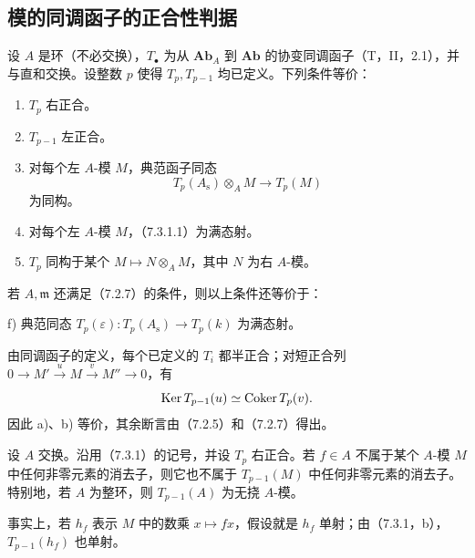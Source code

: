 \subsection{模的同调函子的正合性判据}

设 $A$ 是环（不必交换），$T_\bullet$ 为从 $\mathbf{Ab}_A$ 到 $\mathbf{Ab}$ 的协变同调函子（T，II，2.1），并与直和交换。设整数 $p$ 使得 $T_p,T_{p-1}$ 均已定义。下列条件等价：
\begin{enumerate}[label=\alph*)]
\item $T_p$ 右正合。
\item $T_{p-1}$ 左正合。
\item 对每个左 $A$-模 $M$，典范函子同态
\begin{equation}
 T_p(A_{\mathrm s})\otimes_A M\longrightarrow T_p(M)\tag{7.3.1.1}
\end{equation}
为同构。
\item 对每个左 $A$-模 $M$，（7.3.1.1）为满态射。
\item $T_p$ 同构于某个 $M\mapsto N\otimes_A M$，其中 $N$ 为右 $A$-模。
\end{enumerate}
若 $A,\mathfrak m$ 还满足（7.2.7）的条件，则以上条件还等价于：

\noindent f) 典范同态 $T_p(\varepsilon):T_p(A_{\mathrm s})\to T_p(k)$ 为满态射。

由同调函子的定义，每个已定义的 $T_i$ 都半正合；对短正合列 $0\to M'\xrightarrow{u}M\xrightarrow{v}M''\to0$，有
\[
 \operatorname{Ker} T_{p-1}(u)\simeq\operatorname{Coker} T_p(v).
\]
因此 a)、b) 等价，其余断言由（7.2.5）和（7.2.7）得出。

设 $A$ 交换。沿用（7.3.1）的记号，并设 $T_p$ 右正合。若 $f\in A$ 不属于某个 $A$-模 $M$ 中任何非零元素的消去子，则它也不属于 $T_{p-1}(M)$ 中任何非零元素的消去子。特别地，若 $A$ 为整环，则 $T_{p-1}(A)$ 为无挠 $A$-模。

事实上，若 $h_f$ 表示 $M$ 中的数乘 $x\mapsto fx$，假设就是 $h_f$ 单射；由（7.3.1，b），$T_{p-1}(h_f)$ 也单射。

